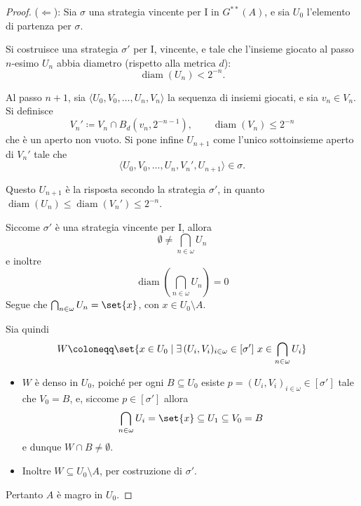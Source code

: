 \documentclass[titlepage]{article}
\newcommand{\1}{\mathds{1}}
\theoremstyle{definition}%
\theoremstyle{plain}
\theoremstyle{remark}
\begin{document}
\begin{proof}
(\(\Leftarrow\)): Sia \(\sigma\) una strategia vincente per I in \(G^{**}(A)\), e sia \(U_{0}\) l'elemento di partenza per \(\sigma\).

Si costruisce una strategia \(\sigma'\) per I, vincente, e tale che l'insieme giocato al passo \(n\)-esimo \(U_{n}\) abbia diametro (rispetto alla metrica \(d\)):
\begin{equation*}
\operatorname{diam}(U_{n})<2^{-n}.
\end{equation*}

Al passo \(n+1\), sia \(\langle U_{0},V_{0},\dots,U_{n}, V_{n}\rangle\) la sequenza di insiemi giocati, e sia \(v_{n} \in V_{n}\). Si definisce
\begin{equation*}
V_{n}'\coloneqq V_{n}\cap B_{d}(v_{n}, 2^{-n-1}), \qquad \operatorname{diam}(V_{n}) \le 2^{-n}
\end{equation*}
che è un aperto non vuoto. Si pone infine \(U_{n+1}\) come l'unico sottoinsieme aperto di \(V_{n}'\) tale che
\begin{equation*}
\langle U_{0},V_{0},\dots,U_{n}, V_{n}', U_{n+1}\rangle \in \sigma.
\end{equation*}

Questo \(U_{n+1}\) è la risposta secondo la strategia \(\sigma'\), in quanto \(\operatorname{diam}(U_{n})\le \operatorname{diam}(V_{n}')\le 2^{-n}\).

Siccome \(\sigma'\) è una strategia vincente per I, allora
\begin{equation*}
\emptyset\neq\bigcap_{n \in \omega} U_{n}
\end{equation*}
e inoltre
\begin{equation*}
\operatorname{diam}\left(\bigcap_{n \in \omega} U_{n}\right) = 0
\end{equation*}
Segue che \(\bigcap_{n \in \omega} U_{n} = \set{x}\), con \(x \in U_{0}\setminus A\).

Sia quindi
\begin{equation*}
W\coloneqq \set{x \in U_{0}\mid
\exists\, (U_{i}, V_{i})_{i \in \omega} \in [\sigma']\ x \in \bigcap_{n \in \omega} U_{i}}
\end{equation*}
\begin{itemize}
\item \(W\) è denso in \(U_{0}\), poiché per ogni \(B \subseteq U_{0}\) esiste \(p = (U_{i}, V_{i})_{i \in \omega} \in [\sigma']\) tale che \(V_{0} = B\), e, siccome \(p \in [\sigma']\) allora
\begin{equation*}
  \bigcap_{n \in \omega} U_{i} = \set{x} \subseteq U_{1} \subseteq V_{0} = B
\end{equation*}
e dunque \(W\cap B\neq \emptyset\).
\item Inoltre \(W \subseteq U_{0}\setminus A\), per costruzione di \(\sigma'\).
\end{itemize}

Pertanto \(A\) è magro in \(U_{0}\).
\end{proof}
\end{document}
